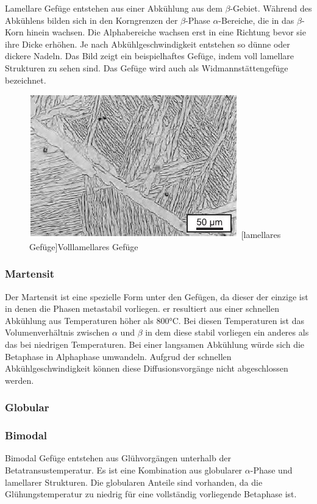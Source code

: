 \documentclass[a4paper, singlepage, 11pt]{tubsreprt}
\begin{document}
Lamellare Gefüge entstehen aus einer Abkühlung aus dem $\beta$-Gebiet. Während des Abkühlens bilden sich in den Korngrenzen der $\beta$-Phase $\alpha$-Bereiche, die in das $\beta$-Korn hinein wachsen. Die Alphabereiche wachsen erst in eine Richtung bevor sie ihre Dicke erhöhen. Je nach Abkühlgeschwindigkeit entstehen so dünne oder dickere Nadeln. Das Bild zeigt ein beispielhaftes Gefüge, indem voll lamellare Strukturen zu sehen sind. Das Gefüge wird auch als Widmannstättengefüge bezeichnet. 

\begin{figure}


	\centering
		\includegraphics[scale=1]{Bilder/lamellar.jpg}
		[lamellares Gefüge]{Volllamellares Gefüge \cite{Leyens2002}}
		\label{fig1}
		
\end{figure}
\subsubsection{Martensit}
Der Martensit ist eine spezielle Form unter den Gefügen, da dieser der einzige ist in denen die Phasen metastabil vorliegen. er resultiert aus einer schnellen Abkühlung aus Temperaturen höher als 800°C. Bei diesen Temperaturen ist das Volumenverhältnis zwischen $\alpha$ und $\beta$ in dem diese stabil vorliegen ein anderes als das bei niedrigen Temperaturen. Bei einer langsamen Abkühlung würde sich die Betaphase in Alphaphase umwandeln. Aufgrud der schnellen Abkühlgeschwindigkeit können diese Diffusionsvorgänge nicht abgeschlossen werden.  
\subsubsection{Globular}
\subsubsection{Bimodal}
Bimodal Gefüge entstehen aus Glühvorgängen unterhalb der Betatransustemperatur. Es ist eine Kombination aus globularer $\alpha$-Phase und lamellarer Strukturen. Die globularen Anteile sind vorhanden, da die Glühungstemperatur zu niedrig für eine vollständig vorliegende Betaphase ist. 
\end{document}
